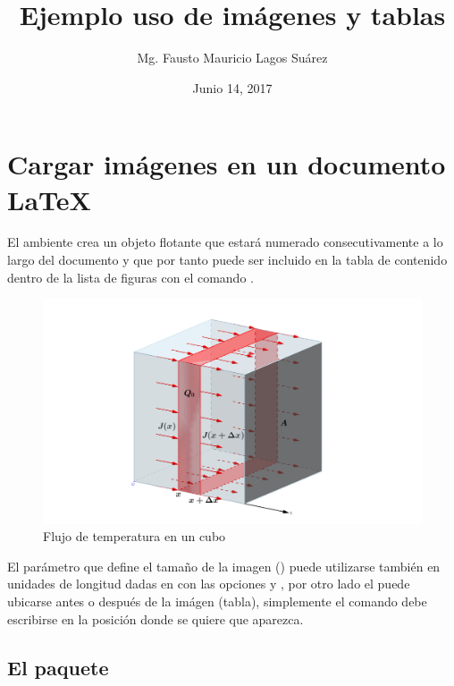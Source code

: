 \documentclass{article}
\title{Ejemplo uso de imágenes y tablas}
\author{Mg. Fausto Mauricio Lagos Suárez}
\date{Junio 14, 2017}
\begin{document}
\maketitle
\renewcommand{\tablename}{Tabla}
\renewcommand{\figurename}{Fig.}
\renewcommand{\contentsname}{Tabla de Contenido}
\renewcommand{\listfigurename}{Lista de Figuras}
\renewcommand{\listtablename}{Lista de Tablas}
\tableofcontents %
\listoffigures %
\listoftables %

\section{Cargar imágenes en un documento \LaTeX{}}

El ambiente  crea un objeto flotante que estará numerado consecutivamente a lo largo del documento y que por tanto puede ser incluido en la tabla de contenido dentro de la lista de figuras con el comando .

\begin{figure}[ht]
	\centering
    \includegraphics[scale = .4]{cubo}
    \caption{Flujo de temperatura en un cubo}
\end{figure}

El parámetro que define el tamaño de la imagen () puede utilizarse también en unidades de longitud dadas en  con las opciones  y , por otro lado el  puede ubicarse antes o después de la imágen (tabla), simplemente el comando  debe escribirse en la posición donde se quiere que aparezca.

\subsection{El paquete }
\end{document}
